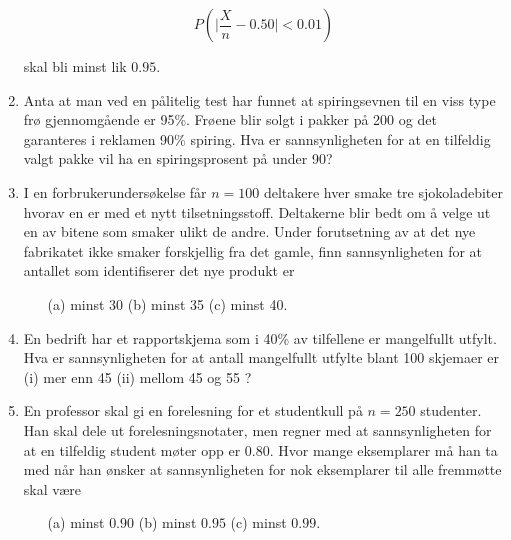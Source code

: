 \begin{enumerate}
  \[   P(\mid \frac{X}{n}-0.50 \mid <0.01) \] 

     \noindent skal bli minst lik $0.95$.

\item Anta at man ved en pålitelig test har funnet at
     spiringsevnen til en viss type frø gjennomgående er 95\%.
     Frøene blir solgt i pakker på 200 og det garanteres i
     reklamen 90\% spiring. Hva er sannsynligheten for at en
     tilfeldig valgt pakke vil ha en spiringsprosent på under 90?

\item I en forbrukerundersøkelse får $n=100$ deltakere hver smake
     tre sjokolade\-biter hvorav en er med et nytt
     tilsetningsstoff. Deltakerne blir bedt om å velge ut en av
     bitene som smaker ulikt de andre. Under forutsetning av at
     det nye fabrikatet ikke smaker forskjellig fra det gamle,
     finn sannsynligheten for at antallet som identifiserer det
     nye produkt er
     \begin{itemize}
     \item[(a)] minst 30   (b) minst 35   (c) minst 40.
     \end{itemize}

\item En bedrift har et rapportskjema som i 40\% av tilfellene er mangelfullt
      utfylt. Hva er sannsynligheten for at antall mangelfullt utfylte blant
      100 skjemaer er (i) mer enn 45 (ii) mellom 45 og 55 ? 

\item En professor skal gi en forelesning for et studentkull på
     $n=250$ studenter. Han skal dele ut forelesningsnotater, men
     regner med at sannsynligheten for at en tilfeldig student
     møter opp er $0.80$. Hvor mange eksemplarer må han ta med
     når han ønsker at sannsynligheten for nok eksemplarer til
     alle fremmøtte skal være
     \begin{itemize}
     \item[(a)] minst $0.90$   (b) minst $0.95$   (c) minst $0.99$.
     \end{itemize}


\end{enumerate}
